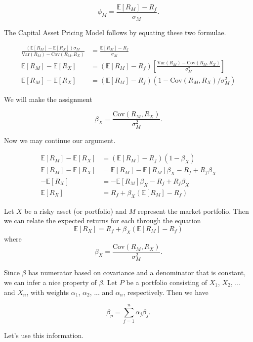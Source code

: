 \documentclass{ximera}
\begin{document}
\[
\phi_M=\frac{\mathbb{E}[R_M]-R_f}{\sigma_M}.
\]

The Capital Asset Pricing Model follows by equating these two formulae. 

\begin{align*}
\frac{(\mathbb{E}[R_M]-\mathbb{E}[R_X])\sigma_M}{\text{Var}(R_M)-\text{Cov}(R_M, R_X)} 	&=\frac{\mathbb{E}[R_M]-R_f}{\sigma_M}\\
\mathbb{E}[R_M]-\mathbb{E}[R_X] 										&=(\mathbb{E}[R_M]-R_f)\left[\frac{\text{Var}(R_M)-\text{Cov}(R_M, R_X)}{\sigma_M^2}\right]\\
\mathbb{E}[R_M]-\mathbb{E}[R_X] 										&=(\mathbb{E}[R_M]-R_f)(1-\text{Cov}(R_M, R_X)/\sigma_M^2)
\end{align*}

We will make the assignment 

\[
\beta_X=\frac{\text{Cov}(R_M, R_X)}{\sigma_M^2}.
\]

Now we may continue our argument.

\begin{align*}
\mathbb{E}[R_M]-\mathbb{E}[R_X] 										&=(\mathbb{E}[R_M]-R_f)(1-\beta_X)\\
\mathbb{E}[R_M]-\mathbb{E}[R_X] 										&=\mathbb{E}[R_M]-\mathbb{E}[R_M]\beta_X-R_f+R_f\beta_X\\
-\mathbb{E}[R_X] 													&=-\mathbb{E}[R_M]\beta_X-R_f+R_f\beta_X\\
\mathbb{E}[R_X] 													&=R_f+\beta_X(\mathbb{E}[R_M]-R_f)
\end{align*}

\begin{theorem}
Let $X$ be a risky asset (or portfolio) and $M$ represent the market portfolio. Then we can relate the expected returns for each through the equation
\[
\mathbb{E}[R_X]=R_f+\beta_X(\mathbb{E}[R_M]-R_f)
\]
where 
\[
\beta_X=\frac{\text{Cov}(R_M, R_X)}{\sigma_M^2}.
\]
\end{theorem}

Since $\beta$ has numerator based on covariance and a denominator that is constant, we can infer a nice property of $\beta$. Let $P$ be a portfolio consisting of $X_1$, $X_2$, ... and $X_n$, with weights $\alpha_1$, $\alpha_2$, ... and $\alpha_n$, respectively. Then we have

\[
\beta_p=\sum_{j=1}^n \alpha_j\beta_j.
\]

Let's use this information.
\end{document}
